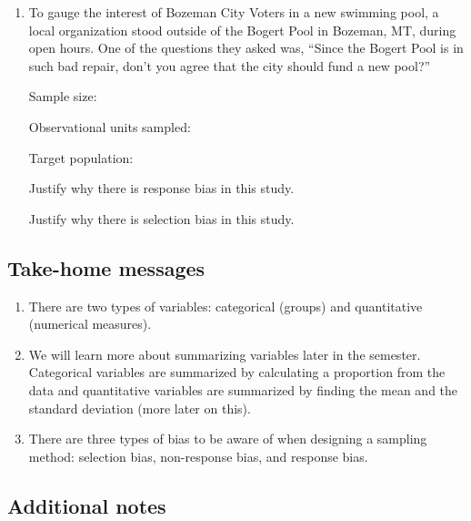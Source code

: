 \documentclass[
]{report}
\begin{document}
\newpage

\begin{enumerate}
\def\labelenumi{\arabic{enumi}.}
\setcounter{enumi}{6}
\item
  To gauge the interest of Bozeman City Voters in a new swimming pool, a local organization stood outside of the Bogert Pool in Bozeman, MT, during open hours. One of the questions they asked was, ``Since the Bogert Pool is in such bad repair, don't you agree that the city should fund a new pool?''
  \vspace{0.1in}

  Sample size:
  \vspace{0.3in}

  Observational units sampled:
  \vspace{0.3in}

  Target population:
  \vspace{0.3in}

  Justify why there is response bias in this study.
  \vspace{0.5in}

  Justify why there is selection bias in this study.
  \vspace{0.5in}
\end{enumerate}

\subsection{Take-home messages}\label{take-home-messages}

\begin{enumerate}
\def\labelenumi{\arabic{enumi}.}
\item
  There are two types of variables: categorical (groups) and quantitative (numerical measures).
\item
  We will learn more about summarizing variables later in the semester. Categorical variables are summarized by calculating a proportion from the data and quantitative variables are summarized by finding the mean and the standard deviation (more later on this).
\item
  There are three types of bias to be aware of when designing a sampling method: selection bias, non-response bias, and response bias.
\end{enumerate}

\subsection{Additional notes}\label{additional-notes}
\end{document}
